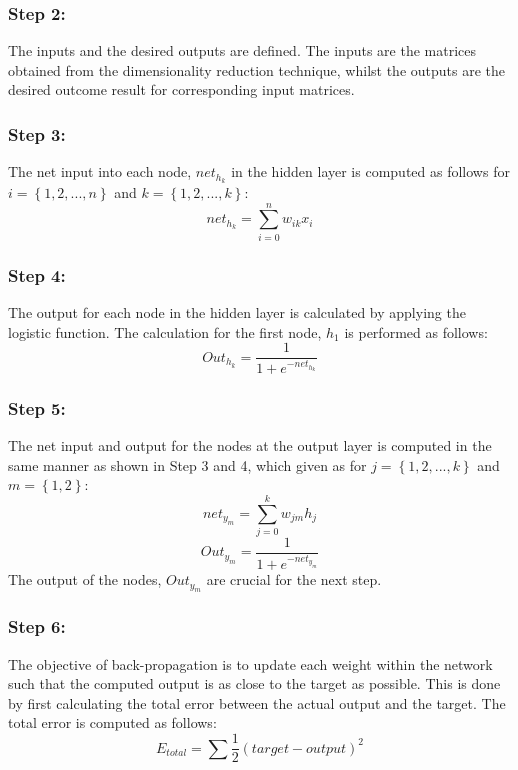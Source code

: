 \documentclass[11pt]{article}
\begin{document}
	\subsubsection{Step 2:}
	The inputs and the desired outputs are defined. The inputs are the matrices obtained from the dimensionality reduction technique, whilst the outputs are the desired outcome result for corresponding input matrices.
	
	\subsubsection{Step 3:}
	The net input into each node, $net_{h_k}$ in the hidden layer is computed as follows for $i = \left\{1, 2, ..., n\right\}$ and $k = \left\{1, 2, ..., k\right\}$:
	\begin{equation}
		net_{h_k} = \sum_{i = 0}^{n} w_{ik}x_i 
	\end{equation}
	
	\subsubsection{Step 4:}
	The output for each node in the hidden layer is calculated by applying the logistic function. The calculation for the first node, $h_1$ is performed as follows:
	\begin{equation}
		Out_{h_k} = \frac{1}{1 + e^{-net_{h_k}}}
	\end{equation}
	
	\subsubsection{Step 5:}
	The net input and output for the nodes at the output layer is computed in the same manner as shown in Step 3 and 4, which given as for $j = \left\{1, 2, ..., k\right\}$ and $m = \left\{1, 2\right\}$:
	\begin{equation}
		net_{y_m} = \sum_{j = 0}^{k} w_{jm}h_j
	\end{equation}
	\begin{equation}
		Out_{y_m} = \frac{1}{1 + e^{-net_{y_m}}}
	\end{equation}
	The output of the nodes, $Out_{y_m}$ are crucial for the next step. 
	
	\subsubsection{Step 6:}
	The objective of back-propagation is to update each weight within the network such that the computed output is as close to the target as possible. This is done by first calculating the total error between the actual output and the target. The total error is computed as follows:
	\begin{equation}
		E_{total} = \sum \frac{1}{2} (target - output)^2
	\end{equation}
	
\end{document}
